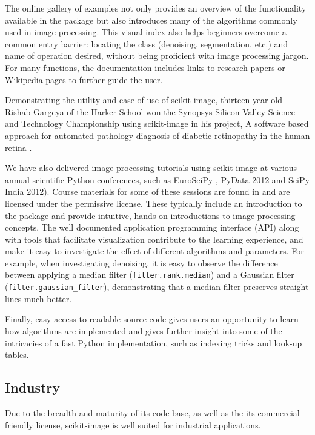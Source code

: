 \documentclass[fleqn,12pt]{wlpeerj}
\begin{document}
The online gallery of examples not only provides
an overview of the functionality available in the package but also
introduces many of the algorithms commonly used in image processing.
This visual index also helps beginners overcome a common entry barrier:
locating the class (denoising, segmentation, etc.) and name of operation
desired, without being proficient with image processing jargon.  For many
functions, the documentation includes links to research papers or Wikipedia
pages to further guide the user.

Demonstrating the utility and ease-of-use of scikit-image, thirteen-year-old
Rishab Gargeya of the Harker School won the Synopsys Silicon
Valley Science and Technology Championship using scikit-image in
his project, \textquotedbl{}A software based approach for automated pathology diagnosis of
diabetic retinopathy in the human retina\textquotedbl{} \cite{sciencefair}.

We have also delivered
image processing tutorials using scikit-image at various
annual scientific Python conferences, such as EuroSciPy \cite{euroscipy2013}, PyData
2012 \cite{pydata2012} and SciPy India
2012). Course materials for some of these sessions are found in
\cite{scipylecturenotes} and are licensed under the permissive \cite{cc-by}
license.  These typically include an introduction to the package and provide
intuitive, hands-on introductions to image processing concepts. The well
documented application programming interface (API) along with tools that
facilitate visualization contribute to the learning experience, and make it
easy to investigate the effect of different algorithms and parameters.
For example, when investigating denoising, it is easy to observe the difference
between applying a median filter (\texttt{filter.rank.median}) and a
Gaussian filter (\texttt{filter.gaussian\_filter}),
demonstrating that a median filter preserves straight lines much better.

Finally, easy access to readable source code gives users an opportunity to
learn how algorithms are implemented and gives further insight into some of the
intricacies of a fast Python implementation, such as indexing tricks
and look-up tables.

\subsection*{Industry}
  \label{industry}

Due to the breadth and maturity of its code base, as well as the its
commercial-friendly license, scikit-image is well suited for
industrial applications.
\end{document}
